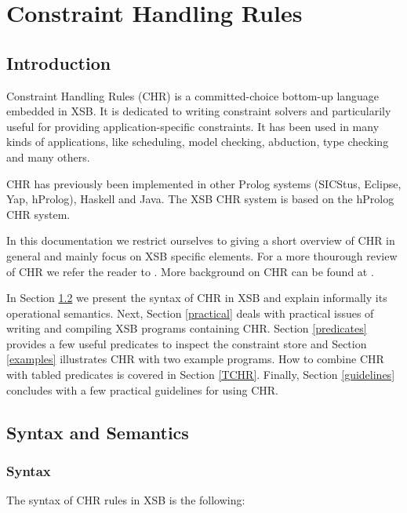 \chapter{Constraint Handling Rules} \label{chr}

\section{Introduction}

Constraint Handling Rules (CHR) is a committed-choice bottom-up language
embedded in XSB. It is dedicated to writing constraint solvers and
particularily useful for providing application-specific constraints.
It has been used in many kinds of applications, like scheduling,
model checking, abduction, type checking and many others.

CHR has previously been implemented in other Prolog systems (SICStus,
Eclipse, Yap, hProlog), Haskell and Java. The XSB CHR system is based on
the hProlog CHR system.

In this documentation we restrict ourselves to giving a short overview of CHR
in general and mainly focus on XSB specific elements.  For a more thourough
review of CHR we refer the reader to \cite{chr_survey}. More background on
CHR can be found at \cite{chr_site}.

In Section \ref{SyntaxAndSemantics} we present the syntax of CHR in XSB and
explain informally its operational semantics. Next, Section \ref{practical}
deals with practical issues of writing and compiling XSB programs containing
CHR. Section \ref{predicates} provides a few useful predicates to inspect
the constraint store and Section \ref{examples} illustrates CHR with two
example programs. How to combine CHR with tabled predicates is covered in
Section \ref{TCHR}. Finally, Section \ref{guidelines} concludes with a few
practical guidelines for using CHR.


\section{Syntax and Semantics} \label{SyntaxAndSemantics}

\subsection{Syntax}

The syntax of CHR rules in XSB is the following:


